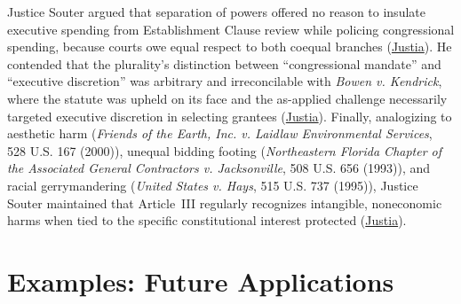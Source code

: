 \documentclass[12pt]{article}
\begin{document}
Justice Souter argued that separation of powers offered no reason to insulate executive spending from Establishment Clause review while policing congressional spending, because courts owe equal respect to both coequal branches (\href{https://supreme.justia.com/cases/federal/us/551/587/}{Justia}). He contended that the plurality's distinction between ``congressional mandate'' and ``executive discretion'' was arbitrary and irreconcilable with \textit{Bowen v. Kendrick}, where the statute was upheld on its face and the as-applied challenge necessarily targeted executive discretion in selecting grantees (\href{https://supreme.justia.com/cases/federal/us/551/587/}{Justia}). Finally, analogizing to aesthetic harm (\textit{Friends of the Earth, Inc. v. Laidlaw Environmental Services}, 528 U.S. 167 (2000)), unequal bidding footing (\textit{Northeastern Florida Chapter of the Associated General Contractors v. Jacksonville}, 508 U.S. 656 (1993)), and racial gerrymandering (\textit{United States v. Hays}, 515 U.S. 737 (1995)), Justice Souter maintained that Article~III regularly recognizes intangible, noneconomic harms when tied to the specific constitutional interest protected (\href{https://supreme.justia.com/cases/federal/us/551/587/}{Justia}).

\section{Examples: Future Applications}
\end{document}
